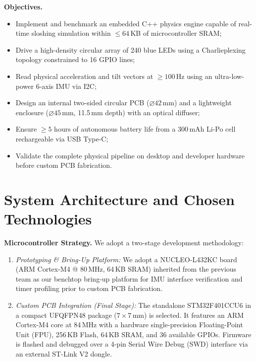 \documentclass[conference]{IEEEtran}
\begin{document}
\textbf{Objectives.}
\begin{itemize}
    \item Implement and benchmark an embedded C++ physics engine capable of real-time sloshing simulation within $\le 64$\,KB of microcontroller SRAM;
    \item Drive a high-density circular array of 240 blue LEDs using a Charlieplexing topology constrained to 16 GPIO lines;
    \item Read physical acceleration and tilt vectors at $\ge 100$\,Hz using an ultra-low-power 6-axis IMU via I2C;
    \item Design an internal two-sided circular PCB ($\varnothing 42$\,mm) and a lightweight enclosure ($\varnothing 45$\,mm, 11.5\,mm depth) with an optical diffuser;
    \item Ensure $\ge 5$ hours of autonomous battery life from a 300\,mAh Li-Po cell rechargeable via USB Type-C;
    \item Validate the complete physical pipeline on desktop and developer hardware before custom PCB fabrication.
\end{itemize}

\section{System Architecture and Chosen Technologies}

\textbf{Microcontroller Strategy.} We adopt a two-stage development methodology:
\begin{enumerate}
    \item \emph{Prototyping \& Bring-Up Platform:} We adopt a NUCLEO-L432KC board (ARM Cortex-M4 @ 80\,MHz, 64\,KB SRAM) inherited from the previous team as our benchtop bring-up platform for IMU interface verification and timer profiling prior to custom PCB fabrication.
    \item \emph{Custom PCB Integration (Final Stage):} The standalone STM32F401CCU6 in a compact UFQFPN48 package ($7 \times 7$\,mm) is selected. It features an ARM Cortex-M4 core at 84\,MHz with a hardware single-precision Floating-Point Unit (FPU), 256\,KB Flash, 64\,KB SRAM, and 36 available GPIOs. Firmware is flashed and debugged over a 4-pin Serial Wire Debug (SWD) interface via an external ST-Link V2 dongle.
\end{enumerate}
\end{document}
